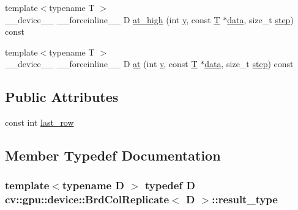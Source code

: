 \begin{DoxyCompactItemize}
{\footnotesize template$<$typename T $>$ }\\\-\_\-\-\_\-device\-\_\-\-\_\- \-\_\-\-\_\-forceinline\-\_\-\-\_\- D \hyperlink{structcv_1_1gpu_1_1device_1_1BrdColReplicate_a4f9f1e916eedd29f4bf657955ba32231}{at\-\_\-high} (int \hyperlink{highgui__c_8h_af1202c02b14870c18fb3a1da73e9e7c7}{y}, const \hyperlink{calib3d_8hpp_a3efb9551a871ddd0463079a808916717}{T} $\ast$\hyperlink{legacy_8hpp_ab9fe6c09e6d02865a953fffc12fe6ca0}{data}, size\-\_\-t \hyperlink{legacy_8hpp_abc16e65f240ed0c8f3e876e8732c0a33}{step}) const 
\item 
{\footnotesize template$<$typename T $>$ }\\\-\_\-\-\_\-device\-\_\-\-\_\- \-\_\-\-\_\-forceinline\-\_\-\-\_\- D \hyperlink{structcv_1_1gpu_1_1device_1_1BrdColReplicate_a3190260762aba8b74b6375b8c884f75a}{at} (int \hyperlink{highgui__c_8h_af1202c02b14870c18fb3a1da73e9e7c7}{y}, const \hyperlink{calib3d_8hpp_a3efb9551a871ddd0463079a808916717}{T} $\ast$\hyperlink{legacy_8hpp_ab9fe6c09e6d02865a953fffc12fe6ca0}{data}, size\-\_\-t \hyperlink{legacy_8hpp_abc16e65f240ed0c8f3e876e8732c0a33}{step}) const 
\end{DoxyCompactItemize}
\subsection*{Public Attributes}
\begin{DoxyCompactItemize}
\item 
const int \hyperlink{structcv_1_1gpu_1_1device_1_1BrdColReplicate_a14918d54ca488703d34aa59ba076acb5}{last\-\_\-row}
\end{DoxyCompactItemize}


\subsection{Member Typedef Documentation}
\hypertarget{structcv_1_1gpu_1_1device_1_1BrdColReplicate_a79eaad7da13304d93c2257c3b3d5dac9}{
\subsubsection[{result\-\_\-type}]{\setlength{\rightskip}{0pt plus 5cm}template$<$typename D $>$ typedef D {\bf cv\-::gpu\-::device\-::\-Brd\-Col\-Replicate}$<$ D $>$\-::{\bf result\-\_\-type}}}\label{structcv_1_1gpu_1_1device_1_1BrdColReplicate_a79eaad7da13304d93c2257c3b3d5dac9}


